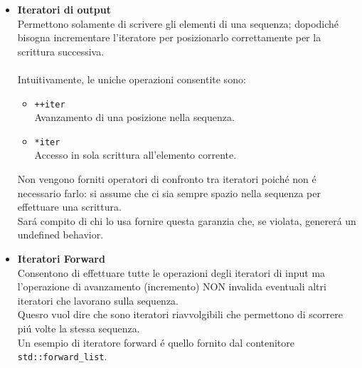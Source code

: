 \documentclass{article}
\begin{document}
\begin{itemize}
In questo caso l'iteratore che indica l'inizio della sequenza si costruisce passando l'input stream (\texttt{std::cin}) mentre quello che indica la fine si ottiene col costruttore di default.\\
\\Quando si opera con un iteratore di input bisogna tener conto che l'operazione di incremento potrebbe invalidare altri iteratori definiti sulla sequenza.\\Infatti, l'operazione di avanzamento \textbf{consuma} l'input letto e se lo si volesse rileggere bisognerebbe averlo salvato opportunamente da qualche parte.\\
\item \textbf{\textcolor{blu}{Iteratori di output}} \\ Permettono solamente di scrivere gli elementi di una sequenza; dopodich\'e bisogna incrementare l'iteratore per posizionarlo correttamente per la scrittura successiva.\\ \\Intuitivamente, le uniche operazioni consentite sono: \\
\begin{itemize}
\item \texttt{++iter}\\Avanzamento di una posizione nella sequenza.\\
\item \texttt{*iter}\\Accesso in sola scrittura all'elemento corrente.\\
\end{itemize}
Non vengono forniti operatori di confronto tra iteratori poich\'e non \'e necessario farlo: si assume che ci sia sempre spazio nella sequenza per effettuare una scrittura.\\Sar\'a compito di chi lo usa fornire questa garanzia che, se violata, generer\'a un undefined behavior. \\
\item \textbf{\textcolor{blu}{Iteratori Forward}} \\ Consentono di effettuare tutte le operazioni degli iteratori di input ma l'operazione di avanzamento (incremento) NON invalida eventuali altri iteratori che lavorano sulla sequenza.\\ Quesro vuol dire che sono iteratori riavvolgibili che permettono di scorrere pi\'u volte la stessa sequenza.\\Un esempio di iteratore forward \'e quello fornito dal contenitore \texttt{std::forward\_list}. \\ \\

\end{itemize}
\end{document}
